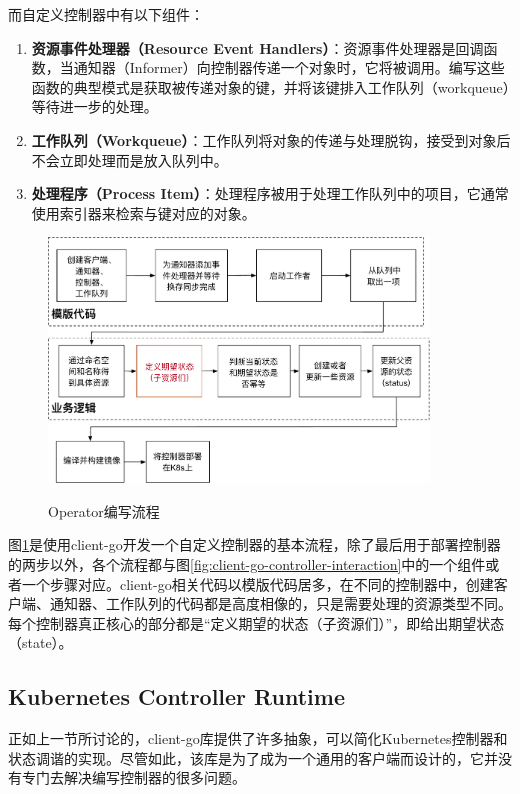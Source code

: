 \documentclass[macfonts,master]{njuthesis}
\begin{document}
而自定义控制器中有以下组件：
\begin{enumerate}
	\item \textbf{资源事件处理器（Resource Event Handlers）}：资源事件处理器是回调函数，当通知器（Informer）向控制器传递一个对象时，它将被调用。编写这些函数的典型模式是获取被传递对象的键，并将该键排入工作队列（workqueue）等待进一步的处理。
	\item \textbf{工作队列（Workqueue）}：工作队列将对象的传递与处理脱钩，接受到对象后不会立即处理而是放入队列中。
	\item \textbf{处理程序（Process Item）}：处理程序被用于处理工作队列中的项目，它通常使用索引器来检索与键对应的对象。
\end{enumerate}

\begin{figure}[htbp]
  \centering
  \includegraphics[width=0.9\textwidth]{pics/coding-operator.pdf}\\
  \caption{Operator编写流程}\label{fig:coding-operator}
\end{figure}

图\ref{fig:coding-operator}是使用client-go开发一个自定义控制器的基本流程，除了最后用于部署控制器的两步以外，各个流程都与图\ref{fig:client-go-controller-interaction}中的一个组件或者一个步骤对应。client-go相关代码以模版代码居多，在不同的控制器中，创建客户端、通知器、工作队列的代码都是高度相像的，只是需要处理的资源类型不同。每个控制器真正核心的部分都是``定义期望的状态（子资源们）''，即给出期望状态（state）。

\subsection{Kubernetes Controller Runtime}

正如上一节所讨论的，client-go库提供了许多抽象，可以简化Kubernetes控制器和状态调谐的实现。尽管如此，该库是为了成为一个通用的客户端而设计的，它并没有专门去解决编写控制器的很多问题。
\end{document}
